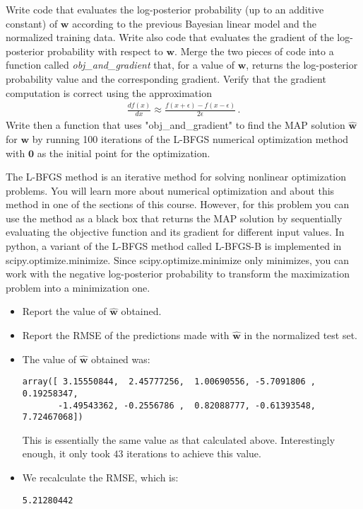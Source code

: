 \documentclass[submit]{harvardml}
\theoremstyle{plain}
\begin{document}
\begin{problem}[14pts]\label{prob:numerical_linear_model}
Write code that evaluates the log-posterior probability (up to an
additive constant) of $\mathbf{w}$ according to the previous Bayesian linear model and the normalized training data.
Write also code that evaluates the gradient of the log-posterior probability with respect to
$\mathbf{w}$. Merge the two pieces of code into a
function called \emph{obj\_and\_gradient} that, for a value of $\mathbf{w}$,
returns the log-posterior probability value and the corresponding gradient.
Verify that the gradient computation is correct using the approximation
\begin{align}
\frac{df(x)}{dx} \approx \frac{f(x + \epsilon) - f(x - \epsilon)}{2\epsilon}\,.
\end{align}
Write then a function that uses "obj\_and\_gradient" to find the MAP solution $\hat{\mathbf{w}}$ for
$\mathbf{w}$ by running 100 iterations of the L-BFGS numerical optimization
method with $\mathbf{0}$ as the initial point for the optimization.

The L-BFGS method is an iterative method for solving nonlinear optimization problems.
You will learn more about numerical optimization and about this method in one of the sections of this course. However,
for this problem you can use the method as a black box that returns the MAP solution
by sequentially evaluating the objective function and its gradient for different input values.
In python, a variant of the L-BFGS method called L-BFGS-B is implemented in scipy.optimize.minimize.
Since scipy.optimize.minimize only minimizes, you can work with the negative
log-posterior probability to transform the maximization problem into a minimization one.

\begin{itemize}
\item Report the value of $\hat{\mathbf{w}}$ obtained.
\item Report the RMSE of the predictions made with $\hat{\mathbf{w}}$ in the normalized test set.
\end{itemize}
\end{problem}

\begin{itemize}
\item The value of $\hat{\mathbf{w}}$ obtained was:
\begin{lstlisting}
array([ 3.15550844,  2.45777256,  1.00690556, -5.7091806 ,  0.19258347,
       -1.49543362, -0.2556786 ,  0.82088777, -0.61393548,  7.72467068])
\end{lstlisting}
This is essentially the same value as that calculated above. Interestingly enough, it only took $43$ iterations to achieve this value.
\item We recalculate the RMSE, which is:
\begin{lstlisting}
5.21280442
\end{lstlisting}
\end{itemize}
\end{document}
